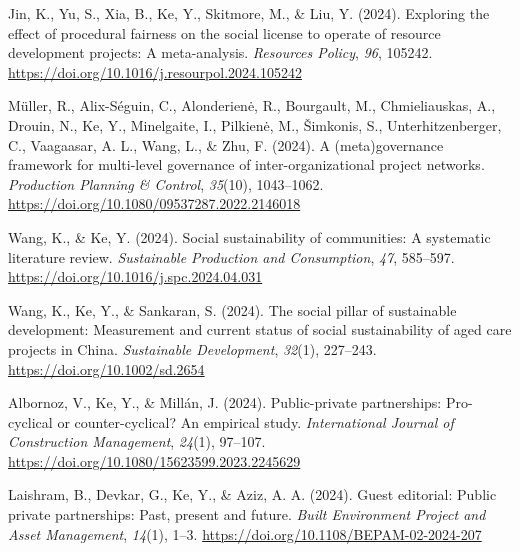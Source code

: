 \documentclass[11pt,a4paper]{report} %
\begin{document}
\begin{tablist}
        \item[2024] \tab{}Jin, K., Yu, S., Xia, B., Ke, Y., Skitmore, M., \& Liu, Y. (2024). Exploring the effect of procedural fairness on the social license to operate of resource development projects: A meta-analysis. \textit{Resources Policy}, \textit{96}, 105242. \href{https://doi.org/10.1016/j.resourpol.2024.105242}{https://doi.org/10.1016/j.resourpol.2024.105242}
        
        \item[2024] \tab{}Müller, R., Alix-Séguin, C., Alonderienė, R., Bourgault, M., Chmieliauskas, A., Drouin, N., Ke, Y., Minelgaite, I., Pilkienė, M., Šimkonis, S., Unterhitzenberger, C., Vaagaasar, A. L., Wang, L., \& Zhu, F. (2024). A (meta)governance framework for multi-level governance of inter-organizational project networks. \textit{Production Planning \& Control}, \textit{35}(10), 1043--1062. \href{https://doi.org/10.1080/09537287.2022.2146018}{https://doi.org/10.1080/09537287.2022.2146018}
        
        \item[2024] \tab{}Wang, K., \& Ke, Y. (2024). Social sustainability of communities: A systematic literature review. \textit{Sustainable Production and Consumption}, \textit{47}, 585--597. \href{https://doi.org/10.1016/j.spc.2024.04.031}{https://doi.org/10.1016/j.spc.2024.04.031}
        
        \item[2024] \tab{}Wang, K., Ke, Y., \& Sankaran, S. (2024). The social pillar of sustainable development: Measurement and current status of social sustainability of aged care projects in China. \textit{Sustainable Development}, \textit{32}(1), 227--243. \href{https://doi.org/10.1002/sd.2654}{https://doi.org/10.1002/sd.2654}
        
        \item[2024] \tab{}Albornoz, V., Ke, Y., \& Millán, J. (2024). Public-private partnerships: Pro-cyclical or counter-cyclical? An empirical study. \textit{International Journal of Construction Management}, \textit{24}(1), 97--107. \href{https://doi.org/10.1080/15623599.2023.2245629}{https://doi.org/10.1080/15623599.2023.2245629}
        
        \item[2024] \tab{}Laishram, B., Devkar, G., Ke, Y., \& Aziz, A. A. (2024). Guest editorial: Public private partnerships: Past, present and future. \textit{Built Environment Project and Asset Management}, \textit{14}(1), 1--3. \href{https://doi.org/10.1108/BEPAM-02-2024-207}{https://doi.org/10.1108/BEPAM-02-2024-207}
        

\end{tablist}
\end{document}
